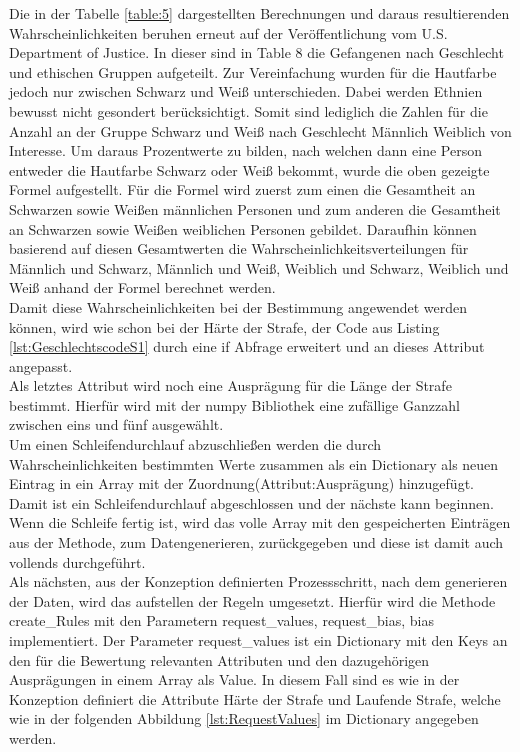 \begin{onehalfspace}
Die in der Tabelle \ref{table:5} dargestellten Berechnungen und daraus resultierenden Wahrscheinlichkeiten beruhen erneut auf der Veröffentlichung vom U.S. Department of Justice. In dieser sind in \glqq{}Table 8\grqq{} die Gefangenen nach Geschlecht und ethischen Gruppen aufgeteilt. Zur Vereinfachung wurden für die Hautfarbe jedoch nur zwischen Schwarz und Weiß unterschieden. Dabei werden Ethnien bewusst nicht gesondert berücksichtigt. Somit sind lediglich die Zahlen für die Anzahl an der Gruppe Schwarz und Weiß nach Geschlecht Männlich Weiblich von Interesse. Um daraus Prozentwerte zu bilden, nach welchen dann eine Person entweder die Hautfarbe Schwarz oder Weiß bekommt, wurde die oben gezeigte Formel aufgestellt. Für die Formel wird zuerst zum einen die Gesamtheit an Schwarzen sowie Weißen männlichen Personen und zum anderen die Gesamtheit an Schwarzen sowie Weißen weiblichen Personen gebildet. Daraufhin können basierend auf diesen Gesamtwerten die Wahrscheinlichkeitsverteilungen für Männlich und Schwarz, Männlich und Weiß, Weiblich und Schwarz, Weiblich und Weiß anhand der Formel berechnet werden.\\
Damit diese Wahrscheinlichkeiten bei der Bestimmung angewendet werden können, wird wie schon bei der Härte der Strafe, der Code aus Listing \ref{lst:GeschlechtscodeS1} durch eine if Abfrage erweitert und an dieses Attribut angepasst.\\
Als letztes Attribut wird noch eine Ausprägung für die Länge der Strafe bestimmt. Hierfür wird mit der \glqq{}numpy\grqq{} Bibliothek eine zufällige Ganzzahl zwischen eins und fünf ausgewählt.\\
Um einen Schleifendurchlauf abzuschließen werden die durch Wahrscheinlichkeiten bestimmten Werte zusammen als ein Dictionary als neuen Eintrag in ein Array mit der Zuordnung(Attribut:Ausprägung) hinzugefügt. Damit ist ein Schleifendurchlauf abgeschlossen und der nächste kann beginnen. Wenn die Schleife fertig ist, wird das volle Array mit den gespeicherten Einträgen aus der Methode, zum Datengenerieren, zurückgegeben und diese ist damit auch vollends durchgeführt.\\
Als nächsten, aus der Konzeption definierten Prozessschritt, nach dem generieren der Daten, wird das aufstellen der Regeln umgesetzt. Hierfür wird die Methode \glqq{}create\_Rules\grqq{} mit den Parametern \glqq{}request\_values, request\_bias, bias\grqq{} implementiert. Der Parameter \glqq{}request\_values\grqq{} ist ein Dictionary mit den Keys an den für die Bewertung relevanten Attributen und den dazugehörigen Ausprägungen in einem Array als Value. In diesem Fall sind es wie in der Konzeption definiert die Attribute Härte der Strafe und Laufende Strafe, welche wie in der folgenden Abbildung \ref{lst:RequestValues} im Dictionary angegeben werden.\\

\end{onehalfspace}
